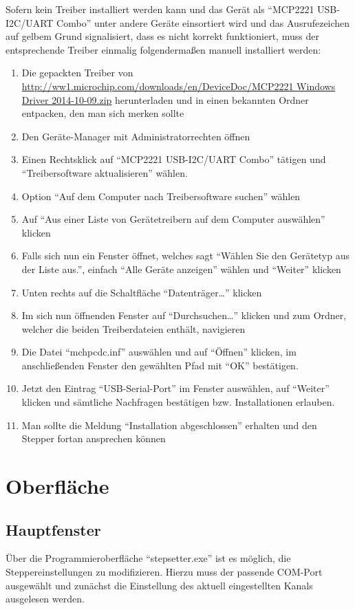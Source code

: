 \documentclass[paper=a4, open=any, numbers=noenddot]{scrbook}
\begin{document}
			Sofern kein Treiber installiert werden kann und das Gerät als \enquote{MCP2221 USB-I2C/UART Combo} unter andere Geräte einsortiert wird und das Ausrufezeichen auf gelbem Grund signalisiert, dass es nicht korrekt funktioniert, muss der entsprechende Treiber einmalig folgendermaßen manuell installiert werden:
			\begin{enumerate}
				\item Die gepackten Treiber von \url{http://ww1.microchip.com/downloads/en/DeviceDoc/MCP2221 Windows Driver 2014-10-09.zip} herunterladen und in einen bekannten Ordner entpacken, den man sich merken sollte
				\item Den Geräte-Manager mit Administratorrechten öffnen
				\item Einen Rechtsklick auf \enquote{MCP2221 USB-I2C/UART Combo} tätigen und \enquote{Treibersoftware aktualisieren} wählen.
				\item Option \enquote{Auf dem Computer nach Treibersoftware suchen} wählen
				\item Auf \enquote{Aus einer Liste von Gerätetreibern auf dem Computer auswählen} klicken
				\item Falls sich nun ein Fenster öffnet, welches sagt \enquote{Wählen Sie den Gerätetyp aus der Liste aus.}, einfach \enquote{Alle Geräte anzeigen} wählen und \enquote{Weiter} klicken
				\item Unten rechts auf die Schaltfläche \enquote{Datenträger\dots} klicken
				\item Im sich nun öffnenden Fenster auf \enquote{Durchsuchen\dots} klicken und zum Ordner, welcher die beiden Treiberdateien enthält, navigieren
				\item Die Datei \enquote{mchpcdc.inf} auswählen und auf \enquote{Öffnen} klicken, im anschließenden Fenster den gewählten Pfad mit \enquote{OK} bestätigen.
				\item Jetzt den Eintrag \enquote{USB-Serial-Port} im Fenster auswählen, auf \enquote{Weiter} klicken und sämtliche Nachfragen bestätigen bzw. Installationen erlauben.
				\item Man sollte die Meldung \enquote{Installation abgeschlossen} erhalten und den Stepper fortan ansprechen können
			\end{enumerate}

		\section{Oberfläche}
			\subsection{Hauptfenster}
				Über die Programmieroberfläche \enquote{stepsetter.exe} ist es möglich, die Steppereinstellungen zu modifizieren. Hierzu muss der passende COM-Port ausgewählt und zunächst die Einstellung des aktuell eingestellten Kanals ausgelesen werden.
\end{document}
